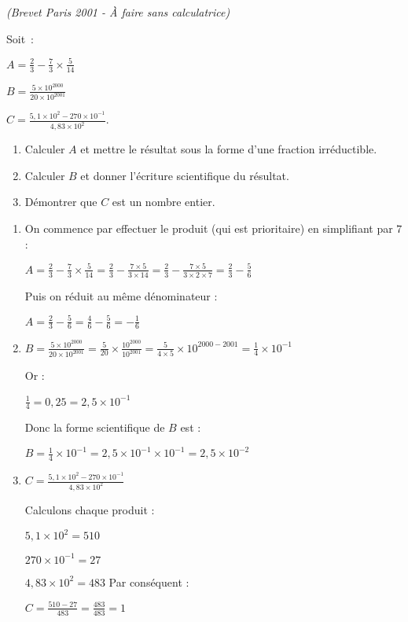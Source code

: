 
\textit{(Brevet Paris 2001 - À faire sans calculatrice)}
\par
Soit~:
\par
 $A = \frac{2}{3}-\frac{7}{3}\times \frac{5}{14}$
\par
 $B = \frac{5\times 10^{2000}}{20\times 10^{2001}}$
\par
 $C = \frac{5,1 \times 10^{2}-270 \times 10^{-1}}{4,83 \times 10^{2}}$. 
\medskip
\begin{enumerate}
     \item
     Calculer $A$ et mettre le résultat sous la forme d'une fraction irréductible.
     \item
     Calculer $B$ et donner l'écriture scientifique du résultat.
     \item
     Démontrer que $C$ est un nombre entier.
\end{enumerate}
\begin{corrige}
     \begin{enumerate}
          \item
          On commence par effectuer le produit (qui est prioritaire) en simplifiant par $7$ :
          \par
          $A = \frac{2}{3}-\frac{7}{3}\times \frac{5}{14} $\nosp$=\frac{2}{3}-\frac{7\times 5}{3\times 14} $\nosp$=\frac{2}{3}-\frac{7\times 5}{3\times 2\times 7} $\nosp$=\frac{2}{3}-\frac{5}{6}$
          \par
          Puis on réduit au même dénominateur :
          \par
          $A = \frac{2}{3}-\frac{5}{6}=\frac{4}{6}-\frac{5}{6}=-\frac{1}{6}$
          \medskip
          \item
          $B = \frac{5\times 10^{2000}}{20\times 10^{2001}} = \frac{5}{20} \times \frac{10^{2000}}{10^{2001}}$$ = \frac{5}{4\times 5}\times 10^{2000-2001}=\frac{1}{4}\times 10^{-1}$
          \par
          Or :
          \par
          $\frac{1}{4}=0,25=2,5\times 10^{-1}$
          \par
          Donc la forme scientifique de $B$ est :
          \par
          $B=\frac{1}{4}\times 10^{-1} $\nosp$=2,5\times 10^{-1}\times 10^{-1} $\nosp$=2,5\times 10^{-2}$
          \medskip
          \item
          $C = \frac{5,1 \times 10^{2}-270 \times 10^{-1}}{4,83 \times 10^{2}}$
          \par
          Calculons chaque produit :
          \par
          $5,1 \times 10^{2}=510$
          \par
          $270 \times 10^{-1}=27$
          \par
          $4,83 \times 10^{2}=483$
          \medskip
          Par conséquent :
          \par
          $C = \frac{510-27}{483}=\frac{483}{483}=1$
     \end{enumerate}
\end{corrige}


